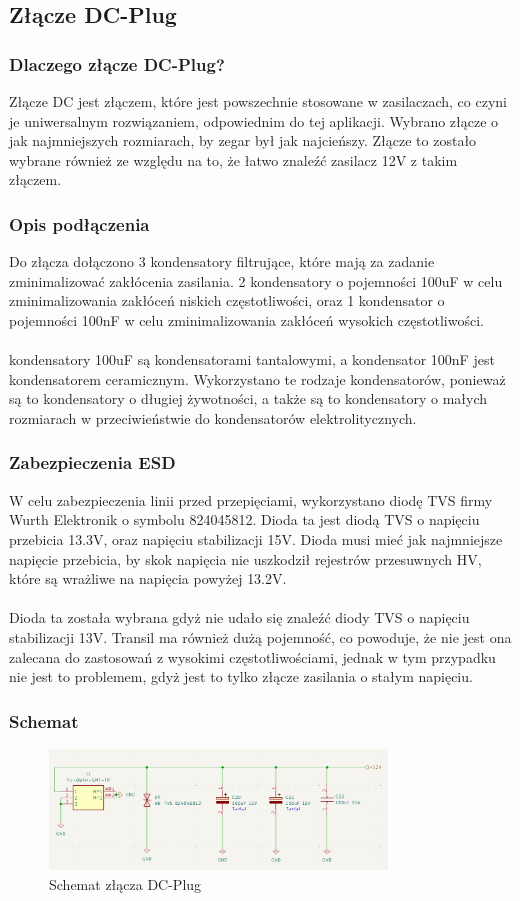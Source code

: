 \documentclass{article}
\begin{document}
\subsection{Złącze DC-Plug}
\subsubsection{Dlaczego złącze DC-Plug?}
Złącze DC jest złączem, które jest powszechnie stosowane w zasilaczach, co czyni je uniwersalnym rozwiązaniem, odpowiednim do tej aplikacji.
Wybrano złącze o jak najmniejszych rozmiarach, by zegar był jak najcieńszy. Złącze to zostało wybrane również ze względu na to, że łatwo znaleźć zasilacz 12V z takim złączem.

\subsubsection{Opis podłączenia}
Do złącza dołączono 3 kondensatory filtrujące, które mają za zadanie zminimalizować zakłócenia zasilania. 2 kondensatory o 
pojemności 100uF w celu zminimalizowania zakłóceń niskich częstotliwości, oraz 1 kondensator o pojemności 100nF w celu zminimalizowania zakłóceń wysokich częstotliwości.
\\\\
kondensatory 100uF są kondensatorami tantalowymi, a kondensator 100nF jest kondensatorem ceramicznym. Wykorzystano te rodzaje kondensatorów, 
ponieważ są to kondensatory o długiej żywotności, a także są to kondensatory o małych rozmiarach w przeciwieństwie do kondensatorów elektrolitycznych.

\subsubsection{Zabezpieczenia ESD}

W celu zabezpieczenia linii przed przepięciami, wykorzystano diodę TVS firmy Wurth Elektronik o symbolu 824045812. Dioda ta jest diodą TVS o napięciu przebicia 13.3V,
oraz napięciu stabilizacji 15V. Dioda musi mieć jak najmniejsze napięcie przebicia, by skok napięcia nie uszkodził rejestrów przesuwnych HV, które są wrażliwe na napięcia powyżej 13.2V.
\\\\
Dioda ta została wybrana gdyż nie udało się znaleźć diody TVS o napięciu stabilizacji 13V. Transil ma również dużą pojemność, co powoduje, że nie jest ona zalecana do 
zastosowań z wysokimi częstotliwościami, jednak w tym przypadku nie jest to problemem, gdyż jest to tylko złącze zasilania o stałym napięciu.

\subsubsection{Schemat}
\begin{figure}[H]
    \centering
    \includegraphics[width=0.8\textwidth]{DcPlug_schemat.png}
    \caption{Schemat złącza DC-Plug}
\end{figure}
\end{document}
